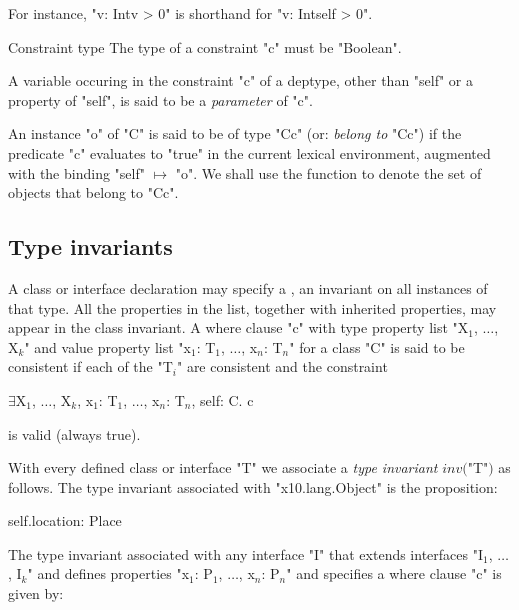For instance, \xcd"v: Int{v > 0}" is shorthand for \xcd"v: Int{self > 0}".

\begin{staticrule}{Constraint type}
  The type of a constraint \xcd"c" must be \xcd"Boolean".  
\end{staticrule}

A variable occuring in the constraint \xcd"c" of a deptype, other than
\xcd"self" or a property of \xcd"self", is said to be a {\em
parameter} of \xcd"c".\label{DepType:Parameter} 

An instance \xcd"o" of \xcd"C" is said to be of type \xcd"C{c}"
(or: {\em belong to}
\xcd"C{c}") if the predicate \xcd"c" evaluates to \xcd"true" in the current lexical
environment, augmented with the binding \xcd"self" $\mapsto$ \xcd"o". We shall
use the function  to denote the set of
objects that belong to \xcd"C{c}". 



\subsection{Type invariants}\label{DepType:TypeInvariant}
\label{DepType:Where}

A class or interface declaration may specify a
, an invariant on all
instances of that type.
All the properties in the list, together with inherited properties,
may appear in the class invariant. A where clause \xcd"c" with
type property list \xcdmath"X$_1$, $\dots$, X$_k$"
and value property list \xcdmath"x$_1$: T$_1$, $\dots$, x$_n$: T$_n$"
for a class \xcd"C" is said to be consistent if each of the \xcdmath"T$_i$" are
consistent and the constraint
\begin{xtenmath}
$\exists$X$_1$, $\dots$, X$_k$, x$_1$: T$_1$, $\dots$, x$_n$: T$_n$, self: C. c
\end{xtenmath}
\noindent is valid (always true).

With every defined class or interface \xcd"T" we associate a {\em type
invariant} $\mathit{inv}($\xcd"T"$)$ as follows. The type
invariant associated with \xcd"x10.lang.Object" is the
proposition:

\begin{xten}
self.location: Place
\end{xten}

The type invariant associated with any interface \xcd"I" that extends
interfaces \xcdmath"I$_1$, $\dots$, I$_k$" and defines properties
\xcdmath"x$_1$: P$_1$, $\dots$, x$_n$: P$_n$" and
specifies a where clause \xcd"c" is given by:

